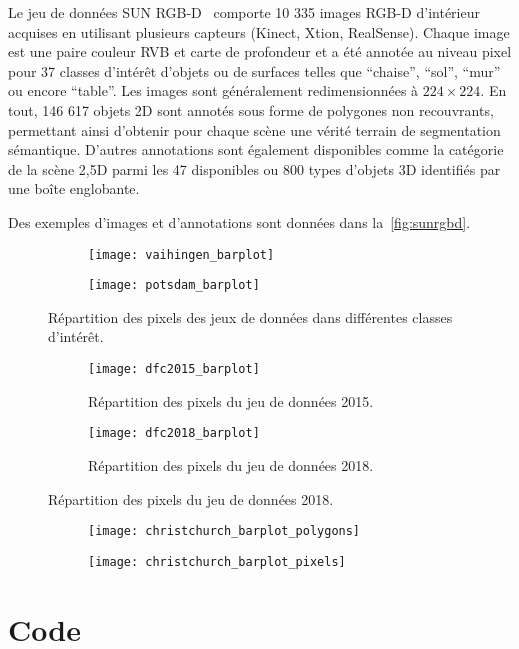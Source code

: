 Le jeu de données SUN RGB-D~\cite{song_sun_2015} comporte 10 335 images \glsdesc{RGB-D} d'intérieur acquises en utilisant plusieurs capteurs (Kinect, Xtion, RealSense). Chaque image est une paire couleur \gls{RVB} et carte de profondeur et a été annotée au niveau pixel pour 37 classes d'intérêt d'objets ou de surfaces telles que ``chaise'', ``sol'', ``mur'' ou encore ``table''. Les images sont généralement redimensionnées à $224\times224$. En tout, 146 617 objets 2D sont annotés sous forme de polygones non recouvrants, permettant ainsi d'obtenir pour chaque scène une vérité terrain de segmentation sémantique. D'autres annotations sont également disponibles comme la catégorie de la scène 2,5D parmi les 47 disponibles ou 800 types d'objets 3D identifiés par une boîte englobante.

Des exemples d'images  et d'annotations sont données dans la~\cref{fig:sunrgbd}.

\begin{figure}[h]
	\begin{subfigure}{0.5\textwidth}
		\texttt{[image: vaihingen\_barplot]}
	\end{subfigure}
	\begin{subfigure}{0.5\textwidth}
		\texttt{[image: potsdam\_barplot]}
	\end{subfigure}
	\caption{Répartition des pixels des jeux de données  dans différentes classes d'intérêt.}
	\label{fig:isprs_barplots}
\end{figure}


\begin{figure}[h]
	\begin{subfigure}[t]{0.5\textwidth}
		\texttt{[image: dfc2015\_barplot]}
		\caption{Répartition des pixels du jeu de données  2015.}
		\label{fig:dfc2015_barplot}
	\end{subfigure}
	\begin{subfigure}[t]{0.5\textwidth}
		\texttt{[image: dfc2018\_barplot]}
		\caption{Répartition des pixels du jeu de données  2018.}
		\label{fig:dfc2018_barplot}
	\end{subfigure}
\end{figure}

\begin{figure}[h]
	\begin{subfigure}{0.5\textwidth}
		\texttt{[image: christchurch\_barplot\_polygons]}
	\end{subfigure}
	\begin{subfigure}{0.5\textwidth}
		\texttt{[image: christchurch\_barplot\_pixels]}
	\end{subfigure}
\end{figure}

%
%
\printbibliography

\chapter{Code}
